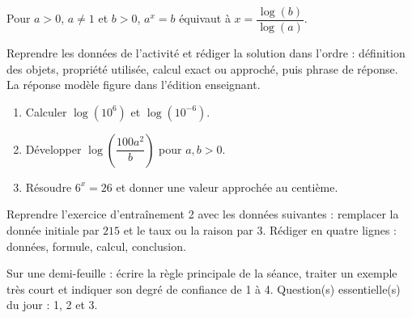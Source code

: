 \begin{traceecrite}Pour $a>0$, $a\neq1$ et $b>0$, $a^x=b$ équivaut à $x=\dfrac{\log(b)}{\log(a)}$.\end{traceecrite}

\begin{exemple}
Reprendre les données de l'activité et rédiger la solution dans l'ordre : définition des objets, propriété utilisée, calcul exact ou approché, puis phrase de réponse. La réponse modèle figure dans l'édition enseignant.
\end{exemple}

\begin{exercice}[-- essentiel]
\begin{enumerate}\item Calculer $\log(10^6)$ et $\log(10^{-6})$.\item Développer $\log\!\left(\dfrac{100a^2}{b}\right)$ pour $a,b>0$.\item Résoudre $6^x=26$ et donner une valeur approchée au centième.\end{enumerate}
\end{exercice}


\begin{dm}Reprendre l'exercice d'entraînement 2 avec les données suivantes : remplacer la donnée initiale par $215$ et le taux ou la raison par $3$. Rédiger en quatre lignes : données, formule, calcul, conclusion.\end{dm}

\begin{sortie}Sur une demi-feuille : écrire la règle principale de la séance, traiter un exemple très court et indiquer son degré de confiance de 1 à 4. Question(s) essentielle(s) du jour : 1, 2 et 3.\end{sortie}

